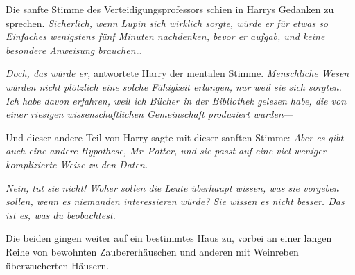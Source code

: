 Die sanfte Stimme des Verteidigungsprofessors schien in Harrys Gedanken zu sprechen.
\emph{Sicherlich, wenn Lupin sich wirklich sorgte, würde er für etwas so Einfaches wenigstens fünf Minuten nachdenken, bevor er aufgab, und keine besondere Anweisung brauchen…}

\emph{Doch, das würde er,} antwortete Harry der mentalen Stimme. \emph{Menschliche Wesen würden nicht plötzlich eine solche Fähigkeit erlangen, nur weil sie sich sorgten. Ich habe davon erfahren, weil ich Bücher in der Bibliothek gelesen habe, die von einer riesigen wissenschaftlichen Gemeinschaft produziert wurden}—

Und dieser andere Teil von Harry sagte mit dieser sanften Stimme:
\emph{Aber es gibt auch eine andere Hypothese, Mr~Potter, und sie passt auf eine viel weniger komplizierte Weise zu den Daten.}


\emph{Nein, tut sie nicht! Woher sollen die Leute überhaupt wissen, was sie vorgeben sollen, wenn es niemanden interessieren würde? Sie wissen es nicht besser. Das ist es, was du beobachtest.}

Die beiden gingen weiter auf ein bestimmtes Haus zu, vorbei an einer langen Reihe von bewohnten Zaubererhäuschen und anderen mit Weinreben überwucherten Häusern.


